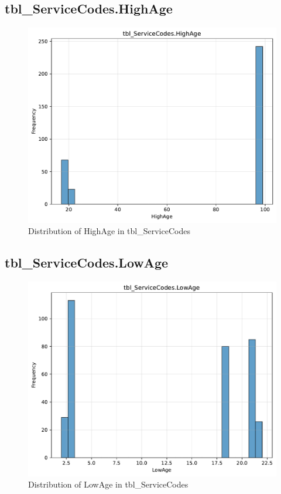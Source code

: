 \subsection{tbl\_ServiceCodes.HighAge}

\begin{figure}[htbp]
\centering
\includegraphics[width=\textwidth]{figures/dbo_tbl_ServiceCodes_HighAge.pdf}
\caption{Distribution of HighAge in tbl\_ServiceCodes}
\end{figure}\newpage

\subsection{tbl\_ServiceCodes.LowAge}

\begin{figure}[htbp]
\centering
\includegraphics[width=\textwidth]{figures/dbo_tbl_ServiceCodes_LowAge.pdf}
\caption{Distribution of LowAge in tbl\_ServiceCodes}
\end{figure}\newpage

